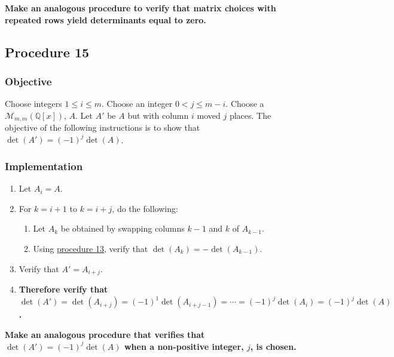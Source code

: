 \documentclass[twocolumn]{article}
\newcommand{\procedure}[2][]{\subsection*{Procedure #2 \ifthenelse{\equal{#1}{}}{}{(#1)}}\label{sec:procedure #2}}
\newcommand{\objective}{\subsubsection*{Objective}}
\newcommand{\implementation}{\subsubsection*{Implementation}}
\begin{document}
			\textbf{Make an analogous procedure to verify that matrix choices with repeated rows yield determinants equal to zero.}
		\procedure{15}
			\objective
				Choose integers $1\le i\le m$. Choose an integer $0<j\le m-i$. Choose a $\mathcal{M}_{m,m}(\mathbb{Q}[x])$, $A$. Let $A'$ be $A$ but with column $i$ moved $j$ places. The objective of the following instructions is to show that $\det(A')=(-1)^j\det(A)$.
			\implementation
				\begin{enumerate}
					\item Let $A_i=A$.
					\item For $k=i+1$ to $k=i+j$, do the following:
					\begin{enumerate}
						\item Let $A_k$ be obtained by swapping columns $k-1$ and $k$ of $A_{k-1}$.
						\item Using \hyperref[sec:procedure 13]{procedure 13}, verify that $\det(A_k)=-\det(A_{k-1})$.
					\end{enumerate}
					\item Verify that $A'=A_{i+j}$.
					\item \textbf{Therefore verify that $\det(A')=\det(A_{i+j})=(-1)^1\det(A_{i+j-1})=\cdots=(-1)^j\det(A_{i})=(-1)^j\det(A)$.}
				\end{enumerate}
			\textbf{Make an analogous procedure that verifies that $\det(A')=(-1)^j\det(A)$ when a non-positive integer, $j$, is chosen.}
			
\end{document}
